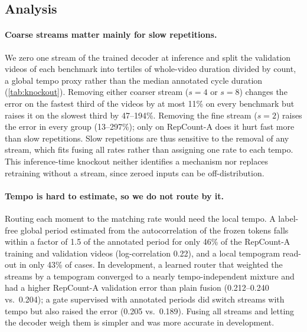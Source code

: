 \subsection{Analysis}
\label{sec:analysis}



\paragraph{Coarse streams matter mainly for slow repetitions.}
\label{sec:observation}
We zero one stream of the trained decoder at inference and split the validation
videos of each benchmark into tertiles of whole-video duration divided by count,
a global tempo proxy rather than the median annotated cycle duration
(\cref{tab:knockout}). Removing either coarser stream ($s{=}4$ or $s{=}8$)
changes the error on the fastest third of the videos by at most 11\% on every
benchmark but raises it on the slowest third by 47--194\%. Removing the fine
stream ($s{=}2$) raises the error in every group (13--297\%); only on
RepCount-A does it hurt fast more than slow repetitions. Slow repetitions are
thus sensitive to the removal of any stream, which fits fusing all rates rather
than assigning one rate to each tempo. This inference-time knockout neither
identifies a mechanism nor replaces retraining without a stream, since zeroed
inputs can be off-distribution.

\paragraph{Tempo is hard to estimate, so we do not route by it.}
Routing each moment to the matching rate would need the local tempo. A label-free
global period estimated from the autocorrelation of the frozen tokens falls within
a factor of 1.5 of the annotated period for only 46\% of the RepCount-A training
and validation videos (log-correlation 0.22), and a local tempogram read-out in
only 43\% of cases. In development, a learned router that weighted the streams
by a tempogram converged to a nearly tempo-independent mixture and had a higher
RepCount-A validation error than plain fusion (0.212--0.240 vs.\ 0.204); a gate
supervised with annotated periods did switch streams with tempo but also raised
the error (0.205 vs.\ 0.189). Fusing all streams and letting the decoder weigh
them is simpler and was more accurate in development.

